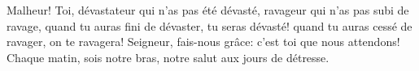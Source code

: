 Malheur! Toi, dévastateur qui n’as pas été dévasté,
	ravageur qui n’as pas subi de ravage,
	quand tu auras fini de dévaster, tu seras dévasté!
	quand tu auras cessé de ravager, on te ravagera!
Seigneur, fais-nous grâce: c’est toi que nous attendons!
	Chaque matin, sois notre bras,
	notre salut aux jours de détresse.
